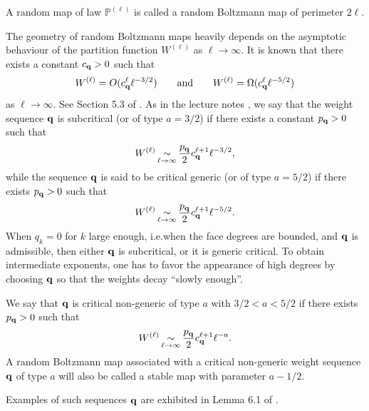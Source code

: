 \documentclass[11pt]{article}
\numberwithin{equation}{section}
\def\P{\mathbb{P}}
\begin{document}
A random map of law $\P^{(\ell)}$ is called a random Boltzmann map of perimeter $2\ell$. {
The geometry of random Boltzmann maps heavily depends on the asymptotic behaviour of the partition function $W^{(\ell)}$ as $\ell \to \infty$. It is known that there exists a constant $c_{\bf q}>0$ such that
$$
W^{(\ell)} = O(c_{\bf q}^\ell \ell^{-3/2}) \qquad \text{and} \qquad W^{(\ell)} = \Omega(c_{\bf q}^\ell \ell^{-5/2})
$$
as $\ell \to \infty$. See Section 5.3 of \cite{StFlour}. As in the lecture notes \cite{StFlour}, we say that the weight sequence $\bf q$ is subcritical (or of type $a=3/2$) if there exists a constant $p_{\bf q} > 0$ such that
$$
W^{(\ell)} \mathop{\sim}\limits_{\ell \to \infty} \frac{p_{\bf q}}{2} c_{\bf q}^{\ell+1} \ell^{-3/2},
$$
while the sequence $\bf q$ is said to be critical generic (or of type $a=5/2$) if there exists $p_{\bf q} > 0$ such that
$$
W^{(\ell)} \mathop{\sim}\limits_{\ell \to \infty} \frac{p_{\bf q}}{2} c_{\bf q}^{\ell+1} \ell^{-5/2}.
$$
When $q_k = 0$ for $k$ large enough, i.e.\@ when the face degrees are bounded, and $\bf q$ is admissible, then either $\bf q$ is subcritical, or it is generic critical. To obtain intermediate exponents, one has to favor the appearance of high degrees by choosing $\bf q$ so that the weights decay ``slowly enough''.

We say that $\bf q$ is critical non-generic of type $a$ with $3/2 < a < 5/2$ if there exists $p_{\bf q} > 0$ such that
\begin{equation}\label{eq asymptotique W}
W^{(\ell)} \mathop{\sim}\limits_{\ell \to \infty} \frac{p_{\bf q}}{2} c_{\bf q}^{\ell+1} \ell^{-a}.
\end{equation}
A random Boltzmann map associated with a critical non-generic weight sequence $\bf q$ of type $a$ will also be called a stable map with parameter $a-1/2$.} Examples of such sequences $\bf q$ are exhibited in Lemma 6.1 of \cite{BC}. 
\end{document}

